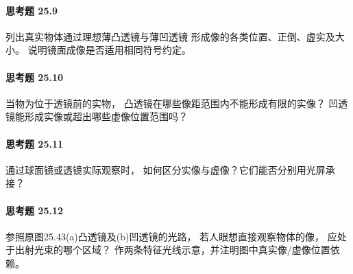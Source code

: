 \paragraph{思考题 25.9}
列出真实物体通过理想薄凸透镜与薄凹透镜
形成像的各类位置、正倒、虚实及大小。
说明镜面成像是否适用相同符号约定。
\paragraph{思考题 25.10}
当物为位于透镜前的实物，
凸透镜在哪些像距范围内不能形成有限的实像？
凹透镜能形成实像或超出哪些虚像位置范围吗？
\paragraph{思考题 25.11}
通过球面镜或透镜实际观察时，
如何区分实像与虚像？它们能否分别用光屏承接？
\paragraph{思考题 25.12}
参照原图25.43(a)凸透镜及(b)凹透镜的光路，
若人眼想直接观察物体的像，
应处于出射光束的哪个区域？
作两条特征光线示意，并注明图中真实像/虚像位置依赖。
